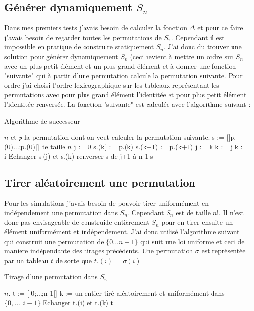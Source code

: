 \documentclass[letterpaper,10pt]{llncs}
\begin{document}
\subsection{Générer dynamiquement $S_n$}

Dans mes premiers tests j'avais besoin de calculer la fonction $\Delta$ et pour ce faire j'avais besoin de regarder toutes les permutations de $S_n$. Cependant il est impossible en pratique de construire statiquement $S_n$. J'ai donc du trouver une solution pour générer dynamiquement $S_n$ (ceci revient à mettre un ordre sur $S_n$ avec un plus petit élément et un plus grand élément et à donner une fonction "suivante" qui à partir d'une permutation calcule la permutation suivante. Pour ordre j'ai choisi l'ordre lexicographique sur les tableaux représentant les permutations avec pour plus grand élément l'identitée et pour plus petit élément l'identitée renversée. La fonction "suivante" est calculée avec l'algorithme suivant :

\begin{algorithm}
\caption{Algorithme de successeur}
\begin{algorithmic}
\REQUIRE $n$ et $p$ la permutation dont on veut calculer la permutation suivante.
\STATE s := [|p.(0)...;p.(0)|] de taille $n$
\STATE j := 0
\STATE s.(k) := p.(k)
\STATE s.(k+1) := p.(k+1)
\STATE j := k
\ENDIF
\ENDFOR
\STATE k := j
\STATE k := i
\ENDIF
\ENDFOR
\STATE Echanger s.(j) et s.(k)
\STATE renverser s de j+1 à n-1
\RETURN s
\end{algorithmic}
\end{algorithm}

\subsection{Tirer aléatoirement une permutation}

Pour les simulations j'avais besoin de pouvoir tirer uniformément en indépendement une permutation dans $S_n$. Cependant $S_n$ est de taille $n!$. Il n'est donc pas envisageable de construide entièrement $S_n$ pour en tirer ensuite un élément uniformément et indépendement. J'ai donc utilisé l'algorithme suivant qui construit une permutation de $\{0 ... n-1\}$ qui suit une loi uniforme et ceci de manière indépendante des tirages précédents. Une permutation $\sigma$ est représentée par un tableau $t$ de sorte que $t.(i)$ = $\sigma(i)$

\begin{algorithm}
\caption{Tirage d'une permutation dans $S_n$}
\begin{algorithmic}
\REQUIRE $n$.
\STATE t := [|0;...;n-1|]
\STATE k := un entier tiré aléatoirement et uniformément dans $\{0, ..., i-1\}$
\STATE Echanger t.(i) et t.(k)
\ENDFOR
\RETURN t
\end{algorithmic}
\end{algorithm}
\end{document}

